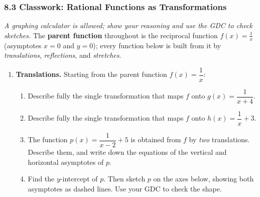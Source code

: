 \documentclass[12pt, twoside]{article}
\begin{document}
\subsubsection*{8.3 Classwork: Rational Functions as Transformations}

\noindent\emph{A graphing calculator is allowed; show your reasoning and use the GDC
to check sketches.} The \textbf{parent function} throughout is the reciprocal
function $f(x)=\tfrac{1}{x}$ (asymptotes $x=0$ and $y=0$); every function below is
built from it by \emph{translations}, \emph{reflections}, and \emph{stretches}.

\medskip

\begin{enumerate}[itemsep=0.4cm]

\item[1.] \textbf{Translations.} Starting from the parent function $f(x)=\dfrac{1}{x}$:

\begin{enumerate}[label=(\alph*), itemsep=0.3cm]
  \item Describe fully the single transformation that maps $f$ onto
  $\displaystyle g(x)=\dfrac{1}{x+4}$.

  \vspace{1.0cm}

  \item Describe fully the single transformation that maps $f$ onto
  $\displaystyle h(x)=\dfrac{1}{x}+3$.

  \vspace{1.0cm}

  \item The function $\displaystyle p(x)=\dfrac{1}{x-2}+5$ is obtained from $f$ by
  \emph{two} translations. Describe them, and write down the equations of the
  vertical and horizontal asymptotes of $p$.

  \vspace{1.7cm}

  \item Find the $y$-intercept of $p$. Then sketch $p$ on the axes below, showing
  both asymptotes as dashed lines. Use your GDC to check the shape.
\end{enumerate}

\begin{figure}[H]
\begin{center}
\begin{tikzpicture}[scale=0.55]


\end{tikzpicture}
\end{center}
\end{figure}
\end{enumerate}
\end{document}
